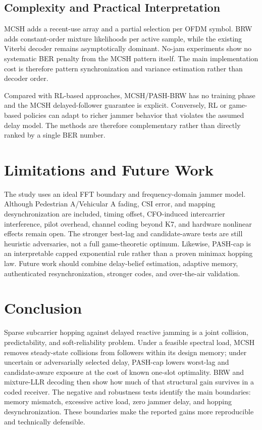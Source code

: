 \documentclass[journal,10pt]{IEEEtran}
\begin{document}
\subsection{Complexity and Practical Interpretation}
MCSH adds a recent-use array and a partial selection per OFDM symbol. BRW adds
constant-order mixture likelihoods per active sample, while the existing
Viterbi decoder remains asymptotically dominant. No-jam experiments show no
systematic BER penalty from the MCSH pattern itself. The main implementation
cost is therefore pattern synchronization and variance estimation rather than
decoder order.

Compared with RL-based approaches, MCSH/PASH-BRW has no training phase and the
MCSH delayed-follower guarantee is explicit. Conversely, RL or game-based
policies can adapt to richer jammer behavior that violates the assumed delay
model. The methods are therefore complementary rather than directly ranked by
a single BER number.

\section{Limitations and Future Work}
The study uses an ideal FFT boundary and frequency-domain jammer model.
Although Pedestrian A/Vehicular A fading, CSI error, and mapping
desynchronization are included, timing offset, CFO-induced intercarrier
interference, pilot overhead, channel coding beyond K7, and hardware nonlinear
effects remain open. The stronger best-lag and candidate-aware tests are still
heuristic adversaries, not a full game-theoretic optimum. Likewise, PASH-cap is
an interpretable capped exponential rule rather than a proven minimax hopping
law. Future work should combine delay-belief estimation, adaptive memory,
authenticated resynchronization, stronger codes, and over-the-air validation.

\section{Conclusion}
Sparse subcarrier hopping against delayed reactive jamming is a joint
collision, predictability, and soft-reliability problem. Under a feasible
spectral load, MCSH removes steady-state collisions from followers within its
design memory; under uncertain or adversarially selected delay, PASH-cap lowers
worst-lag and candidate-aware exposure at the cost of known one-slot
optimality. BRW and mixture-LLR decoding then show how much of that structural
gain survives in a coded receiver. The negative and robustness tests identify
the main boundaries: memory mismatch, excessive active load, zero jammer delay,
and hopping desynchronization. These boundaries make the reported gains more
reproducible and technically defensible.

\vfill
\balance


\end{document}
